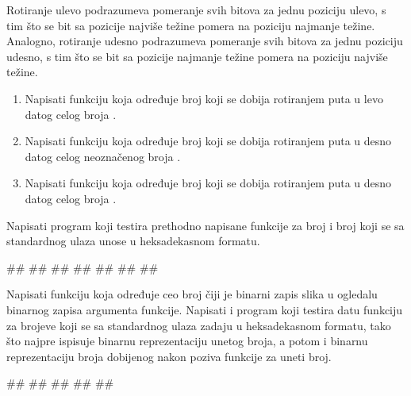 \begin{Exercise}[label=205]
Rotiranje ulevo podrazumeva pomeranje svih bitova za jednu poziciju ulevo, s tim što se bit sa pozicije najviše težine pomera na poziciju najmanje težine. Analogno, rotiranje udesno podrazumeva pomeranje svih bitova za jednu poziciju udesno, s tim što se bit sa pozicije najmanje težine pomera na poziciju najviše težine.
\begin{enumerate}
\item Napisati funkciju  koja određuje broj koji se dobija rotiranjem  puta u levo datog celog broja . 
\item Napisati funkciju  koja određuje broj koji se dobija rotiranjem  puta u desno datog celog neoznačenog broja . 
\item Napisati funkciju  koja određuje broj koji se dobija rotiranjem  puta u desno datog celog broja . 
\end{enumerate}
Napisati program koji testira prethodno napisane funkcije za broj  i broj  koji se sa standardnog ulaza unose u heksadekasnom formatu.

\begin{maxitest}
\begin{test}{1}
#\naslovUlaz#
##
#\naslovIzlaz#
##
##
##
##
\end{test}
\end{maxitest}

\end{Exercise}
\begin{Answer}[ref=205]
\end{Answer}

\begin{Exercise}[label=206]
Napisati funkciju  koja određuje ceo broj čiji je binarni zapis slika u ogledalu binarnog zapisa argumenta funkcije. Napisati i program koji testira datu funkciju za brojeve koji se sa standardnog ulaza zadaju u heksadekasnom formatu, tako što najpre ispisuje binarnu reprezentaciju unetog broja, a potom i binarnu reprezentaciju broja dobijenog nakon poziva funkcije  za uneti broj.

\begin{maxitest}
\begin{test}{1}
#\naslovUlaz#
##
#\naslovIzlaz#
##
##
\end{test}
\end{maxitest}

\end{Exercise}
\begin{Answer}[ref=206]
\end{Answer}

